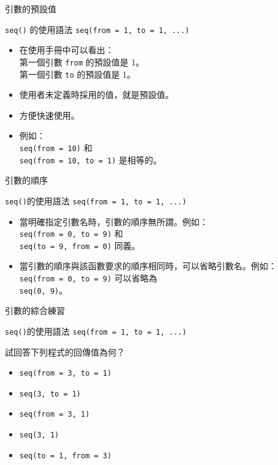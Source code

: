 \documentclass[12pt]{beamer}
\begin{document}
\begin{frame}[fragile]{引數的預設值}

\begin{block}{\texttt{seq()} 的使用語法}
\verb+seq(from = 1, to = 1, ...)+ \\
\end{block}
\begin{itemize}
\item 在使用手冊中可以看出：
  \\ 第一個引數 \verb+from+ 的預設值是 1。
  \\ 第一個引數 \verb+to+ 的預設值是 1。
\item 使用者未定義時採用的值，就是預設值。
\item 方便快速使用。
\item 例如：\\
  \verb+seq(from = 10)+ 和 \\
  \verb+seq(from = 10, to = 1)+ 是相等的。
\end{itemize}
\end{frame}


\begin{frame}[fragile]{引數的順序}

\begin{block}{\texttt{seq()}的使用語法}
\verb+seq(from = 1, to = 1, ...)+ \\
\end{block}

\begin{itemize}
\item 當明確指定引數名時，引數的順序無所謂。例如：\\ \verb+seq(from = 0, to = 9)+ 和 \\ \verb+seq(to = 9, from = 0)+ 同義。
\item 當引數的順序與該函數要求的順序相同時，可以省略引數名。例如：\\ \verb+seq(from = 0, to = 9)+ 可以省略為 \\ \verb+seq(0, 9)+。
\end{itemize}
\end{frame}


\begin{frame}[fragile]{引數的綜合練習}

\begin{block}{\texttt{seq()}的使用語法}
\verb+seq(from = 1, to = 1, ...)+ \\
\end{block}

\begin{block}{試回答下列程式的回傳值為何？}
\begin{itemize}
\item \verb+seq(from = 3, to = 1)+
\item \verb+seq(3, to = 1)+
\item \verb+seq(from = 3, 1)+
\item \verb+seq(3, 1)+
\item \verb+seq(to = 1, from = 3)+
\end{itemize}
\end{block}
\end{frame}
\end{document}
